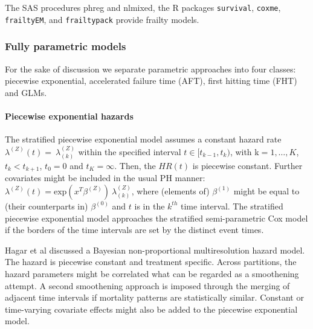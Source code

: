 
\noindent The SAS procedures phreg and nlmixed, the R packages \texttt{survival}, \texttt{coxme}, \texttt{frailtyEM}, and \texttt{frailtypack} provide frailty models. 

\noindent 


\subsubsection{Fully parametric models}\label{parametric}

\noindent 

\noindent For the sake of discussion we separate parametric approaches into four classes: piecewise exponential, accelerated failure time (AFT), first hitting time (FHT) and GLMs.

\noindent 


\paragraph{Piecewise exponential hazards} \label{piecewise}

\noindent 


\noindent The stratified piecewise exponential model assumes a constant hazard rate ${\lambda }^{\left(Z\right)}\left(t\right)=\ {\lambda }^{(Z)}_{(k)}$ within the specified interval $t\in [t_{k-1},t_k)$, with k$=1,\dots, K$, $t_k<t_{k+1}$, $t_0=0$ and $t_K=\infty $. Then, the $HR\left(t\right)$ is piecewise constant. Further covariates might be included in the usual PH manner: ${\lambda }^{\left(Z\right)}\left(t\right)={\mathrm{exp} (x^T{\beta }^{\left(Z\right)})\ }{\lambda }^{(Z)}_{(k)}$, where (elements of) ${\beta }^{\left(1\right)}$ might be equal to (their counterparts in) ${\beta }^{\left(0\right)}$ and $t$ is in the $k^{th}$ time interval. The stratified piecewise exponential model approaches the stratified semi-parametric Cox model if the borders of the time intervals are set by the distinct event times. 

\noindent Hagar et al \cite{Hagar.2017} discussed a Bayesian non-proportional multiresolution hazard model. The hazard is piecewise constant and treatment specific. Across partitions, the hazard parameters might be correlated what can be regarded as a smoothening attempt. A second smoothening approach is imposed through the merging of adjacent time intervals if mortality patterns are statistically similar. Constant or time-varying covariate effects might also be added to the piecewise exponential model. 

